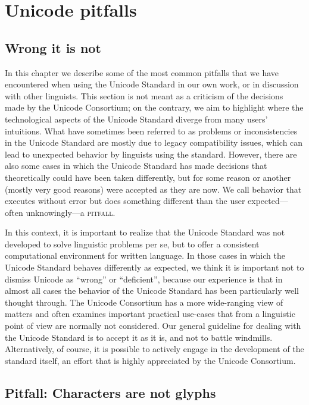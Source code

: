 \chapter{Unicode pitfalls}
\label{unicode-pitfalls}

\section{Wrong it is not}
\label{wrong-it-is-not}

In this chapter we describe some of the most common pitfalls that we have
encountered when using the Unicode Standard in our own work, or in discussion
with other linguists. This section is not meant as a criticism of the decisions
made by the Unicode Consortium; on the contrary, we aim to highlight where the
technological aspects of the Unicode Standard diverge from many users'
intuitions. What have sometimes been referred to as problems or inconsistencies
in the Unicode Standard are mostly due to legacy compatibility issues, which can
lead to unexpected behavior by linguists using the standard. However, there are
also some cases in which the Unicode Standard has made decisions that
theoretically could have been taken differently, but for some reason or another
(mostly very good reasons) were accepted as they are now. We call behavior that
executes without error but does something different than the user
expected---often unknowingly---a \textsc{pitfall}.

In this context, it is important to realize that the Unicode Standard was not
developed to solve linguistic problems per se, but to offer a consistent
computational environment for written language. In those cases in which the
Unicode Standard behaves differently as expected, we think it is important not
to dismiss Unicode as ``wrong'' or ``deficient'', because our
experience is that in almost all cases the behavior of the Unicode Standard has
been particularly well thought through. The Unicode Consortium has a more
wide-ranging view of matters and often examines important practical use-cases
that from a linguistic point of view are normally not considered. Our general
guideline for dealing with the Unicode Standard is to accept it as it is, and
not to battle windmills. Alternatively, of course, it is possible to actively
engage in the development of the standard itself, an effort that is highly
appreciated by the Unicode Consortium.

\section{Pitfall: Characters are not glyphs}
\label{pitfall-characters-are-not-glyphs}

